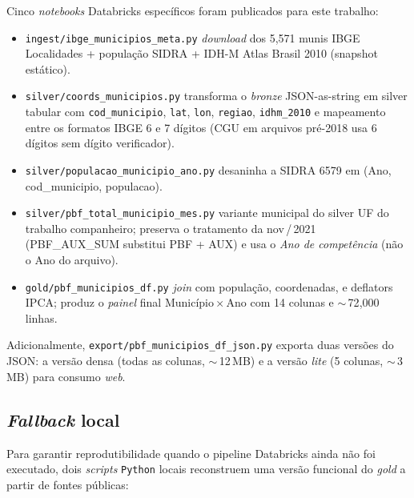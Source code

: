 \documentclass[12pt,a4paper,oneside]{article}
\begin{document}
Cinco \textit{notebooks} Databricks específicos foram publicados para
este trabalho:

\begin{itemize}
    \item \texttt{ingest/ibge\_municipios\_meta.py} \textemdash{}
    \textit{download} dos 5{,}571 munis IBGE Localidades + população
    SIDRA + IDH-M Atlas Brasil 2010 (snapshot estático).

    \item \texttt{silver/coords\_municipios.py} \textemdash{}
    transforma o \textit{bronze} JSON-as-string em silver tabular com
    \texttt{cod\_municipio}, \texttt{lat}, \texttt{lon},
    \texttt{regiao}, \texttt{idhm\_2010} e mapeamento entre os
    formatos IBGE 6 e 7 dígitos (CGU em arquivos pré-2018 usa 6
    dígitos sem dígito verificador).

    \item \texttt{silver/populacao\_municipio\_ano.py} \textemdash{}
    desaninha a SIDRA 6579 em (Ano, cod\_municipio, populacao).

    \item \texttt{silver/pbf\_total\_municipio\_mes.py} \textemdash{}
    variante municipal do silver UF do trabalho companheiro;
    preserva o tratamento da nov\,/\,2021 (PBF\_AUX\_SUM substitui
    PBF + AUX) e usa o \textit{Ano de competência} (não o Ano do
    arquivo).

    \item \texttt{gold/pbf\_municipios\_df.py} \textemdash{} \textit{join}
    com população, coordenadas, e deflators IPCA; produz o
    \textit{painel} final Município\,$\times$\,Ano com 14 colunas e
    $\sim$\,72{,}000 linhas.
\end{itemize}

Adicionalmente, \texttt{export/pbf\_municipios\_df\_json.py} exporta
duas versões do JSON: a versão densa (todas as colunas, $\sim$\,12\,MB)
e a versão \textit{lite} (5 colunas, $\sim$\,3\,MB) para consumo
\textit{web}.

\subsection{\textit{Fallback} local}

Para garantir reprodutibilidade quando o pipeline Databricks ainda
não foi executado, dois \textit{scripts} \texttt{Python} locais
reconstruem uma versão funcional do \textit{gold} a partir de fontes
públicas:
\end{document}
